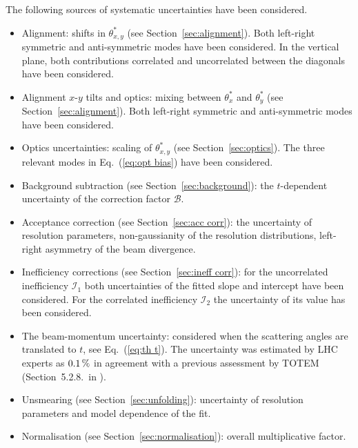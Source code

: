 The following sources of systematic uncertainties have been considered.
\begin{itemize}[noitemsep,topsep=0pt]

\item Alignment: shifts in $\theta^*_{x,y}$ (see Section~\ref{sec:alignment}). Both left-right symmetric and anti-symmetric modes have been considered. In the vertical plane, both contributions correlated and uncorrelated between the diagonals have been considered.

\item Alignment $x$-$y$ tilts and optics: mixing between $\theta^*_{x}$ and $\theta^*_{y}$ (see Section~\ref{sec:alignment}). Both left-right symmetric and anti-symmetric modes have been considered.

\item Optics uncertainties: scaling of $\theta^*_{x,y}$ (see Section~\ref{sec:optics}). The three relevant modes in Eq.~(\ref{eq:opt bias}) have been considered.

\item Background subtraction (see Section~\ref{sec:background}): the $t$-dependent uncertainty of the correction factor $\mathcal{B}$.

\item Acceptance correction (see Section~\ref{sec:acc corr}): the uncertainty of resolution parameters, non-gaussianity of the resolution distributions, left-right asymmetry of the beam divergence.

\item Inefficiency corrections (see Section~\ref{sec:ineff corr}): for the uncorrelated inefficiency $\mathcal{I}_1$ both uncertainties of the fitted slope and intercept have been considered. For the correlated inefficiency $\mathcal{I}_2$ the uncertainty of its value has been considered.

\item The beam-momentum uncertainty: considered when the scattering angles are translated to $t$, see Eq.~(\ref{eq:th t}). The uncertainty was estimated by LHC experts as $0.1\,{\rm \%}$ \cite{beam-mom-unc} in agreement with a previous assessment by TOTEM (Section~5.2.8.~in \cite{totem-8tev-90m}).

\item Unsmearing (see Section~\ref{sec:unfolding}): uncertainty of resolution parameters and model dependence of the fit.

\item Normalisation (see Section~\ref{sec:normalisation}): overall multiplicative factor.

\end{itemize}

